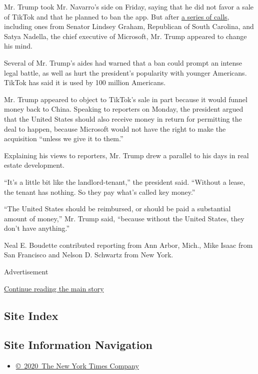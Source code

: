 Mr. Trump took Mr. Navarro's side on Friday, saying that he did not
favor a sale of TikTok and that he planned to ban the app. But after
\href{https://www.nytimes.com/2020/08/02/business/economy/trump-tiktok-china-national-security.html}{a
series of calls}, including ones from Senator Lindsey Graham, Republican
of South Carolina, and Satya Nadella, the chief executive of Microsoft,
Mr. Trump appeared to change his mind.

Several of Mr. Trump's aides had warned that a ban could prompt an
intense legal battle, as well as hurt the president's popularity with
younger Americans. TikTok has said it is used by 100 million Americans.

Mr. Trump appeared to object to TikTok's sale in part because it would
funnel money back to China. Speaking to reporters on Monday, the
president argued that the United States should also receive money in
return for permitting the deal to happen, because Microsoft would not
have the right to make the acquisition ``unless we give it to them.''

Explaining his views to reporters, Mr. Trump drew a parallel to his days
in real estate development.

``It's a little bit like the landlord-tenant,'' the president said.
``Without a lease, the tenant has nothing. So they pay what's called key
money.''

``The United States should be reimbursed, or should be paid a
substantial amount of money,'' Mr. Trump said, ``because without the
United States, they don't have anything.''

Neal E. Boudette contributed reporting from Ann Arbor, Mich., Mike Isaac
from San Francisco and Nelson D. Schwartz from New York.

Advertisement

\protect\hyperlink{after-bottom}{Continue reading the main story}

\hypertarget{site-index}{%
\subsection{Site Index}\label{site-index}}

\hypertarget{site-information-navigation}{%
\subsection{Site Information
Navigation}\label{site-information-navigation}}

\begin{itemize}
\tightlist
\item
  \href{https://help.nytimes.com/hc/en-us/articles/115014792127-Copyright-notice}{©~2020~The
  New York Times Company}
\end{itemize}

